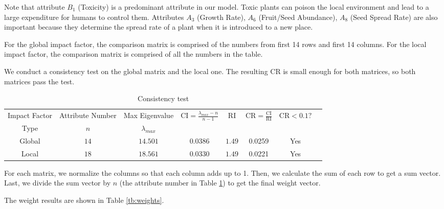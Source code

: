 \documentclass[12pt]{article}
\begin{document}
		Note that attribute $B_1$ (Toxicity) is a predominant attribute in our model.  Toxic plants can poison the local environment and lead to a large expenditure for humans to control them.  Attributes $A_3$ (Growth Rate), $A_6$ (Fruit/Seed Abundance), $A_8$ (Seed Spread Rate) are also important because they  determine the spread rate of a plant when it is introduced to a new place.
		
		For the global impact factor, the comparison matrix is comprised of the numbers from first 14 rows and first 14 columns.  For the local impact factor, the comparison matrix is comprised of all the numbers in the table.  
		
		We conduct a consistency test on the global matrix and the local one.  The resulting CR is small enough for both matrices, so both matrices pass the test.
		
		{
			\fontsize{10}{14}\selectfont
			{
				\begin{longtable}{cccccccc}
					\caption{Consistency test}
					\label{tb:consistency}\\
					
					\toprule
					Impact Factor&Attribute Number&Max Eigenvalue 
					&\multirow{2}{*}{$\mathrm{CI}=\displaystyle \frac{\lambda_{max}-n}{n-1}$}
					&\multirow{2}{*}{$\mathrm{RI}$}
					&\multirow{2}{*}{$\mathrm{CR}=\displaystyle \frac{\mathrm{CI}}{\mathrm{RI}}$}
					&\multirow{2}{*}{$\mathrm{CR}<0.1?$}\\
					Type&$n$&$\lambda_{max}$\\
					\toprule
					Global&$14$&$14.501$&$0.0386$&$1.49$&0.0259&Yes\\
					Local&$18$&$18.561$&$0.0330$&$1.49$&0.0221&Yes\\
					\bottomrule
				\end{longtable}
			}
		}	
		
		For each matrix, we normalize the columns so that each column adds up to 1.  Then, we calculate the sum of each row to get a sum vector.  Last, we divide the sum vector by $n$ (the attribute number in Table \ref{tb:consistency}) to get the final weight vector.  
		
		The weight results are shown in Table \ref{tb:weights}.
	
\end{document}
